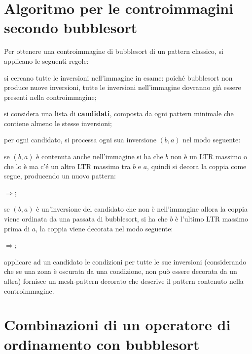 \section{Algoritmo per le controimmagini secondo bubblesort}
Per ottenere una controimmagine di bubblesort di un pattern classico, si applicano le seguenti regole:
\begin{description}
	\item si cercano tutte le inversioni nell'immagine in esame: poich\'e bubblesort non produce nuove inversioni, tutte le inversioni nell'immagine dovranno gi\`a essere presenti nella controimmagine;
	\item si considera una lista di \textbf{candidati}, composta da ogni pattern minimale che contiene almeno le stesse inversioni;
	\item per ogni candidato, si processa ogni sua inversione $(b,a)$ nel modo seguente:
	\begin{description}
	\item se $(b,a)$ \`e contenuta anche nell'immagine si ha che $b$ non \`e un LTR massimo o che lo \`e ma c'\'e un altro LTR massimo tra $b$ e $a$, quindi si decora la coppia come segue, producendo un nuovo pattern:
	\begin{center}
		$\Rightarrow$;
	\end{center}
	\item se $(b,a)$ \`e un'inversione del candidato che non \`e nell'immagine allora la coppia viene ordinata da una passata di bubblesort, si ha che $b$ \`e l'ultimo LTR massimo prima di $a$, la coppia viene decorata nel modo seguente:
	\begin{center}
		$\Rightarrow$;\\
	\end{center}
	\end{description}
	\item applicare ad un candidato le condizioni per tutte le sue inversioni (considerando che se una zona \`e oscurata da una condizione, non pu\`o essere decorata da un altra) fornisce un mesh-pattern decorato che descrive il pattern contenuto nella controimmagine.
\end{description}
\section{Combinazioni di un operatore di ordinamento con bubblesort}
